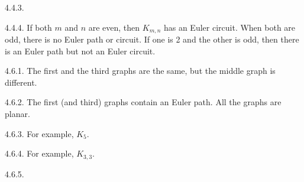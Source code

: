 \begin {itemize}
\begin{ans}{4.4.3.}
\end{ans}
\begin{ans}{4.4.4.}
		If both $m$ and $n$ are even, then $K_{m,n}$ has an Euler circuit.  When both are odd, there is no Euler path or circuit.  If one is 2 and the other is odd, then there is an Euler path but not an Euler circuit. %
	
\end{ans}
\protect \end {itemize}
 \protect {} \protect \begin {itemize} 
\begin{ans}{4.6.1.}
		The first and the third graphs are the same, but the middle graph is different.
	
\end{ans}
\begin{ans}{4.6.2.}
		The first (and third) graphs contain an Euler path.  All the graphs are planar.
	
\end{ans}
\begin{ans}{4.6.3.}
		For example, $K_5$.
	
\end{ans}
\begin{ans}{4.6.4.}
		For example, $K_{3,3}$.
	
\end{ans}
\begin{ans}{4.6.5.}
	

\end{ans}
\end{itemize}

